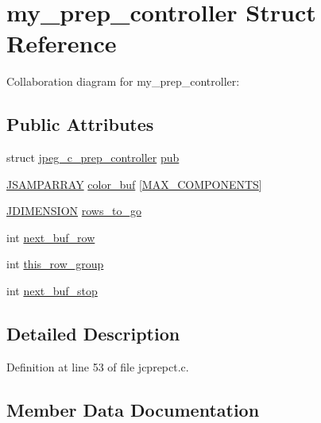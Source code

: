 \hypertarget{structmy__prep__controller}{}\section{my\+\_\+prep\+\_\+controller Struct Reference}
\label{structmy__prep__controller}


Collaboration diagram for my\+\_\+prep\+\_\+controller\+:
\subsection*{Public Attributes}
\begin{DoxyCompactItemize}
\item 
struct \mbox{\hyperlink{structjpeg__c__prep__controller}{jpeg\+\_\+c\+\_\+prep\+\_\+controller}} \mbox{\hyperlink{structmy__prep__controller_a3fb45ffb334d46e9786e32eefded333a}{pub}}
\item 
\mbox{\hyperlink{jpeglib_8h_ac9d5d1b829ed51769db69a37271a7e91}{J\+S\+A\+M\+P\+A\+R\+R\+AY}} \mbox{\hyperlink{structmy__prep__controller_ac1479671472328faf5d381a202658783}{color\+\_\+buf}} \mbox{[}\mbox{\hyperlink{jmorecfg_8h_a6d8c910a1fdb6d4762a05f7250e64322}{M\+A\+X\+\_\+\+C\+O\+M\+P\+O\+N\+E\+N\+TS}}\mbox{]}
\item 
\mbox{\hyperlink{jmorecfg_8h_a04ed4674f6f1d0d50ec241531e38274f}{J\+D\+I\+M\+E\+N\+S\+I\+ON}} \mbox{\hyperlink{structmy__prep__controller_a824b65d503dae6698d6a482d49a8043c}{rows\+\_\+to\+\_\+go}}
\item 
int \mbox{\hyperlink{structmy__prep__controller_af93cf69d2ea14660586c93a1b08774a2}{next\+\_\+buf\+\_\+row}}
\item 
int \mbox{\hyperlink{structmy__prep__controller_a2fd911bc5ad6043822b493554513b8bb}{this\+\_\+row\+\_\+group}}
\item 
int \mbox{\hyperlink{structmy__prep__controller_a1332bc531a2d55aaef228a3a9a3fd62f}{next\+\_\+buf\+\_\+stop}}
\end{DoxyCompactItemize}


\subsection{Detailed Description}


Definition at line 53 of file jcprepct.\+c.



\subsection{Member Data Documentation}
\mbox{\label{structmy__prep__controller_ac1479671472328faf5d381a202658783}} 
